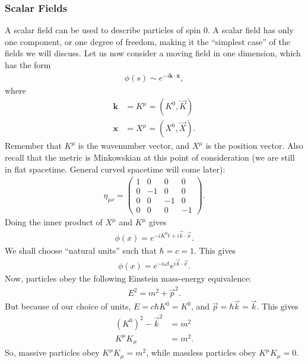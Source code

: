 \documentclass[a4paper,11pt]{article}
\numberwithin{equation}{section}
\theoremstyle{definition}
\begin{document}
\subsubsection{Scalar Fields}
A scalar field can be used to describe particles of spin 0. A scalar field has only one component, or one degree of freedom, making it the ``simplest case'' of the fields we will discuss. Let us now consider a moving field in one dimension, which has the form
\begin{align*}
\phi(s) \sim e^{-i\mathbf{k}\cdot\mathbf{x}},
\end{align*}
where
\begin{align*}
\mathbf{k} &= K^\mu = (K^0, \vec{K})\\
\mathbf{x} &= X^\mu = (X^0, \vec{X}).
\end{align*}
Remember that $K^\mu$ is the wavenumber vector, and $X^\mu$ is the position vector. Also recall that the metric is Minkowskian at this point of consideration (we are still in flat spacetime. General curved spacetime will come later):
\begin{align*}
\eta_{\mu\nu} = \begin{pmatrix}
1 & 0 & 0 & 0\\
0 & -1 & 0 & 0\\
0 & 0 & -1 & 0\\
0 & 0 & 0 & -1
\end{pmatrix}.
\end{align*} 
Doing the inner product of $X^\mu$ and $K^\mu$ gives
\begin{align*}
\phi(x) = e^{-iK^0t + i\vec{k}\cdot\vec{x}}.
\end{align*}
We shall choose ``natural units'' such that $\hbar = c = 1$. This gives
\begin{align*}
\phi(x) = e^{-i\omega t}e^{i\vec{k}\cdot\vec{x}}.
\end{align*}
Now, particles obey the following Einstein mass-energy equivalence:
\begin{align*}
E^2 = m^2 + \vec{p}^2.
\end{align*}
But because of our choice of units, $E = c\hbar K^0= K^0$, and $\vec{p} = \hbar \vec{k} = \vec{k}$. This gives
\begin{align*}
\left( K^0\right)^2 - \vec{k}^2 &= m^2\\
K^\mu K_\mu &= m^2.
\end{align*}
So, massive particles obey $K^\mu K_\mu = m^2$, while massless particles obey $K^\mu K_\mu = 0$. \\
\end{document}
